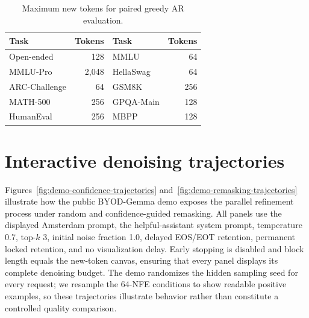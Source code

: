 \documentclass{article}
\begin{document}
\begin{table}[h]
\caption{Maximum new tokens for paired greedy AR evaluation.}
\label{tab:ar-inference}
\centering
\small
\begin{tabular}{lr@{\qquad}lr}
\toprule
Task & Tokens & Task & Tokens \\
\midrule
Open-ended & 128 & MMLU & 64 \\
MMLU-Pro & 2,048 & HellaSwag & 64 \\
ARC-Challenge & 64 & GSM8K & 256 \\
MATH-500 & 256 & GPQA-Main & 128 \\
HumanEval & 256 & MBPP & 128 \\
\bottomrule
\end{tabular}
\end{table}

\section{Interactive denoising trajectories}
\label{app:demo-trajectories}

Figures~\ref{fig:demo-confidence-trajectories} and~\ref{fig:demo-remasking-trajectories} illustrate how the public BYOD-Gemma demo exposes the parallel refinement process under random and confidence-guided remasking. All panels use the displayed Amsterdam prompt, the helpful-assistant system prompt, temperature 0.7, top-$k$ 3, initial noise fraction 1.0, delayed EOS/EOT retention, permanent locked retention, and no visualization delay. Early stopping is disabled and block length equals the new-token canvas, ensuring that every panel displays its complete denoising budget. The demo randomizes the hidden sampling seed for every request; we resample the 64-NFE conditions to show readable positive examples, so these trajectories illustrate behavior rather than constitute a controlled quality comparison.
\end{document}
